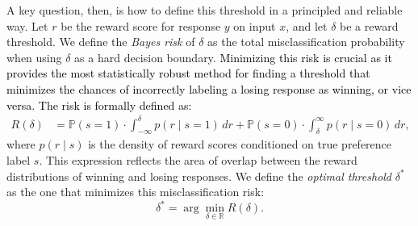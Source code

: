 \documentclass{article} %
\newcommand\fix[1]{\textcolor{black}{#1}}
\newcommand\rebuttal[1]{\textcolor{black}{#1}}
\begin{document}
A key question, then, is how to define this threshold in a principled and reliable way. Let $r$ be the reward score for response $y$ on input $x$, and let $\delta$ be a reward threshold. We define the \textit{Bayes risk} of $\delta$ as the total misclassification probability when using $\delta$ as a hard decision boundary. \fix{Minimizing this risk is crucial as it provides the most statistically robust method for finding a threshold that minimizes the chances of incorrectly labeling a losing response as winning, or vice versa. The risk is formally defined as:}
\begin{align}
R(\delta) &= \mathbb{P}(s=1) \cdot \int_{-\infty}^{\delta} p(r \mid s=1)\,dr + \mathbb{P}(s=0) \cdot \int_{\delta}^{\infty} p(r \mid s=0)\,dr,
\end{align}
where $p(r\mid s)$ is the density of reward scores conditioned on true preference label $s$. This expression reflects the area of overlap between the reward distributions of winning and losing responses. We define the \textit{optimal threshold} $\delta^*$ as the one that minimizes this misclassification risk:
\begin{equation}
\delta^* = \arg\min_{\delta\in\mathbb{R}} R(\delta).
\end{equation}
 
\end{document}
